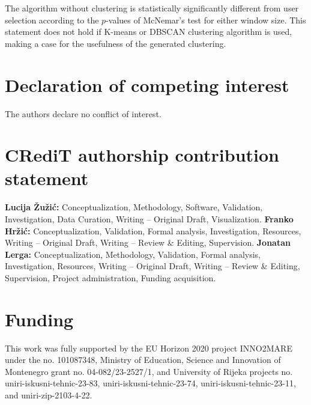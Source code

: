 \documentclass[preprint,12pt]{elsarticle}
\begin{document}
The algorithm without clustering is statistically significantly different from user selection according to the $p$-values of McNemar's test for either window size. This statement does not hold if K-means or DBSCAN clustering algorithm is used, making a case for the usefulness of the generated clustering.

\section*{Declaration of competing interest}
The authors declare no conflict of interest.

\section*{CRediT authorship contribution statement}
\textbf{Lucija \v{Z}u\v{z}i\'{c}:} Conceptualization, Methodology, Software, Validation, Investigation, Data Curation, Writing -- Original Draft, Visualization. \textbf{Franko Hr\v{z}i\'{c}:} Conceptualization,  Validation, Formal analysis, Investigation, Resources, Writing -- Original Draft, Writing -- Review \& Editing, Supervision. \textbf{Jonatan Lerga:} Conceptualization, Methodology, Validation, Formal analysis, Investigation, Resources, Writing -- Original Draft, Writing -- Review \& Editing, Supervision, Project administration, Funding acquisition.

\section*{Funding}
This work was fully supported by the EU Horizon 2020 project INNO2MARE under the no. 101087348, Ministry of Education, Science and Innovation of Montenegro grant no. 04-082/23-2527/1, and University of Rijeka projects no. uniri-iskusni-tehnic-23-83, uniri-iskusni-tehnic-23-74, uniri-iskusni-tehnic-23-11, and uniri-zip-2103-4-22.
\end{document}
